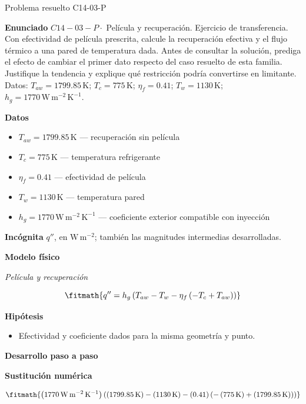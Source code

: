 \documentclass[10pt,openany]{book}
\begin{document}
\begin{studiumworked}{Problema resuelto C14-03-P}


\noindent\textbf{Enunciado}
\(C14-03-P \cdot\) Película y recuperación. Ejercicio de transferencia. Con efectividad de película prescrita, calcule la recuperación efectiva y el flujo térmico a una pared de temperatura dada. Antes de consultar la solución, prediga el efecto de cambiar el primer dato respecto del caso resuelto de esta familia. Justifique la tendencia y explique qué restricción podría convertirse en limitante. Datos: \(T_{aw}=1799.85\, \mathrm{K}\); \(T_c=775\, \mathrm{K}\); \(\eta_f=0.41\); \(T_w=1130\, \mathrm{K}\); \(h_g=1770\, \mathrm{W}\,\mathrm{m}^{-2}\,\mathrm{K}^{-1}\).

\noindent\textbf{Datos}
\begin{itemize}
\item $T_{aw} = 1799.85\,\mathrm{K}$ — recuperación sin película
\item $T_c = 775\,\mathrm{K}$ — temperatura refrigerante
\item $\eta_f = 0.41$ — efectividad de película
\item $T_w = 1130\,\mathrm{K}$ — temperatura pared
\item $h_g = 1770\,\mathrm{W}\,\mathrm{m}^{-2}\,\mathrm{K}^{-1}$ — coeficiente exterior compatible con inyección
\end{itemize}

\noindent\textbf{Incógnita}
$q''$, en $\mathrm{W\,m^{-2}}$; también las magnitudes intermedias desarrolladas.

\noindent\textbf{Modelo físico}

\noindent\textit{Película y recuperación}

\[
\fitmath{q''=h_g \left(T_{aw} - T_w - \eta_f \left(- T_c + T_{aw}\right)\right)}
\]

\noindent\textbf{Hipótesis}
\begin{itemize}
\item Efectividad y coeficiente dados para la misma geometría y punto.
\end{itemize}

\noindent\textbf{Desarrollo paso a paso}



\noindent\textbf{Sustitución numérica}

\[
\fitmath{\left(1770\,\mathrm{W}\,\mathrm{m}^{-2}\,\mathrm{K}^{-1}\right) \left(\left(1799.85\,\mathrm{K}\right) - \left(1130\,\mathrm{K}\right) - \left(0.41\right) \left(- \left(775\,\mathrm{K}\right) + \left(1799.85\,\mathrm{K}\right)\right)\right)}
\]


\end{studiumworked}
\end{document}
